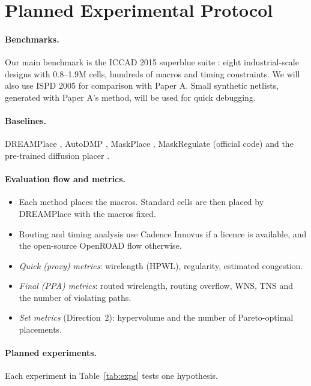 \documentclass{article}
\begin{document}
\section{Planned Experimental Protocol}
\label{sec:protocol}

\paragraph{Benchmarks.} Our main benchmark is the ICCAD 2015 superblue suite \citep{kim2015iccad}:
eight industrial-scale designs with 0.8--1.9M cells, hundreds of macros and timing constraints. We
will also use ISPD 2005 for comparison with Paper A. Small synthetic netlists, generated with Paper A's
method, will be used for quick debugging.

\paragraph{Baselines.} DREAMPlace \citep{lin2021dreamplace}, AutoDMP \citep{agnesina2023autodmp},
MaskPlace \citep{lai2022maskplace}, MaskRegulate \citep{xue2024maskregulate} (official code) and the
pre-trained diffusion placer \citep{lee2025diffusion}.

\paragraph{Evaluation flow and metrics.}
\begin{itemize}
  \item Each method places the macros. Standard cells are then placed by DREAMPlace with the macros
  fixed.
  \item Routing and timing analysis use Cadence Innovus if a licence is available, and the open-source
  OpenROAD flow \citep{ajayi2019openroad} otherwise.
  \item \emph{Quick (proxy) metrics}: wirelength (HPWL), regularity, estimated congestion.
  \item \emph{Final (PPA) metrics}: routed wirelength, routing overflow, WNS, TNS and the number of
  violating paths.
  \item \emph{Set metrics} (Direction~2): hypervolume and the number of Pareto-optimal placements.
\end{itemize}

\paragraph{Planned experiments.} Each experiment in Table~\ref{tab:exps} tests one hypothesis.
\end{document}
